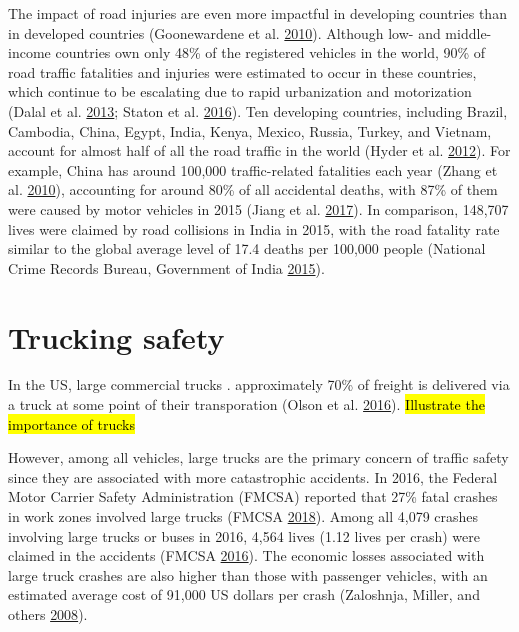 \documentclass[12pt]{book}
\numberwithin{equation}{chapter}
\begin{document}
The impact of road injuries are even more impactful in developing countries than in developed countries (Goonewardene et al. \protect\hyperlink{ref-goonewardene2010road}{2010}).
Although low- and middle-income countries own only 48\% of the registered vehicles in the world, 90\% of road traffic fatalities and injuries were estimated to occur in these countries, which continue to be escalating due to rapid urbanization and motorization (Dalal et al. \protect\hyperlink{ref-dalal2013economics}{2013}; Staton et al. \protect\hyperlink{ref-staton2016road}{2016}).
Ten developing countries, including Brazil, Cambodia, China, Egypt, India, Kenya, Mexico, Russia, Turkey, and Vietnam, account for almost half of all the road traffic in the world (Hyder et al. \protect\hyperlink{ref-hyder2012addressing}{2012}).
For example, China has around 100,000 traffic-related fatalities each year (Zhang et al. \protect\hyperlink{ref-zhang2010road}{2010}), accounting for around 80\% of all accidental deaths, with 87\% of them were caused by motor vehicles in 2015 (Jiang et al. \protect\hyperlink{ref-jiang2017transport}{2017}).
In comparison, 148,707 lives were claimed by road collisions in India in 2015, with the road fatality rate similar to the global average level of 17.4 deaths per 100,000 people (National Crime Records Bureau, Government of India \protect\hyperlink{ref-india2015}{2015}).

\hypertarget{trucking-safety}{%
\section{Trucking safety}\label{trucking-safety}}

In the US, large commercial trucks . approximately 70\% of freight is delivered via a truck at some point of their transporation (Olson et al. \protect\hyperlink{ref-olson2016weight}{2016}). \hl{Illustrate the importance of trucks}

However, among all vehicles, large trucks are the primary concern of traffic safety since they are associated with more catastrophic accidents. In 2016, the Federal Motor Carrier Safety Administration (FMCSA) reported that 27\% fatal crashes in work zones involved large trucks (FMCSA \protect\hyperlink{ref-fmcsareport2016}{2018}). Among all 4,079 crashes involving large trucks or buses in 2016, 4,564 lives (1.12 lives per crash) were claimed in the accidents (FMCSA \protect\hyperlink{ref-fmcsafacts2016}{2016}). The economic losses associated with large truck crashes are also higher than those with passenger vehicles, with an estimated average cost of 91,000 US dollars per crash (Zaloshnja, Miller, and others \protect\hyperlink{ref-zaloshnja2008unit}{2008}).
\end{document}
